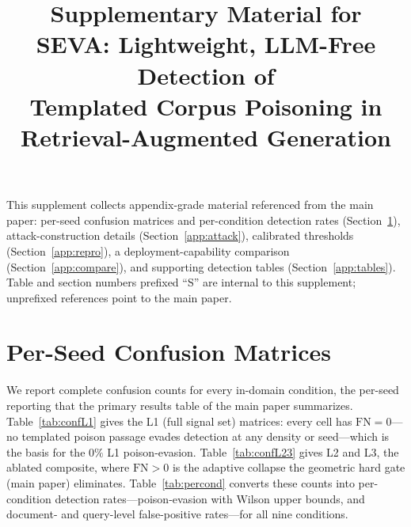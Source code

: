 \documentclass[conference]{IEEEtran}
\begin{document}
\title{Supplementary Material for\\
SEVA: Lightweight, LLM-Free Detection of\\
Templated Corpus Poisoning in\\
Retrieval-Augmented Generation}

\author{
}

\maketitle

\noindent This supplement collects appendix-grade material referenced from the main
paper: per-seed confusion matrices and per-condition detection rates
(Section~\ref{app:confusion}), attack-construction details (Section~\ref{app:attack}),
calibrated thresholds (Section~\ref{app:repro}), a deployment-capability comparison
(Section~\ref{app:compare}), and supporting detection tables (Section~\ref{app:tables}). Table
and section numbers prefixed ``S'' are internal to this supplement; unprefixed references
point to the main paper.

\section{Per-Seed Confusion Matrices}
\label{app:confusion}
We report complete confusion counts for every in-domain condition, the per-seed
reporting that the primary results table of the main paper summarizes. Table~\ref{tab:confL1}
gives the L1 (full signal set) matrices: every cell has $\mathrm{FN}=0$---no
templated poison passage evades detection at any density or seed---which is the
basis for the $0\%$ L1 poison-evasion. Table~\ref{tab:confL23} gives L2 and L3, the
ablated composite, where $\mathrm{FN}>0$ is the adaptive collapse the geometric hard
gate (main paper) eliminates. Table~\ref{tab:percond} converts these
counts into per-condition detection rates---poison-evasion with Wilson upper bounds,
and document- and query-level false-positive rates---for all nine conditions.
\end{document}
